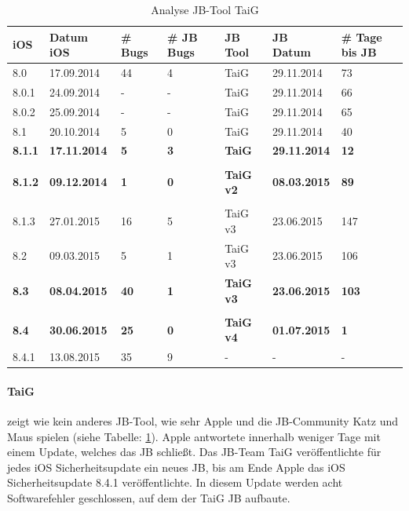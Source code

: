 \begin{table}[htp!]
    \begin{center}
        \begin{tabular}{| p{10mm} | p{22mm} | p{17mm} | p{12mm} | p{18mm} | p{22mm} | p{15mm} |} \hline
            \textbf{iOS} & \textbf{Datum iOS} & \textbf{\# Bugs} & \textbf{\# JB Bugs} & \textbf{JB Tool} & \textbf{JB Datum} & \textbf{\# Tage bis JB} \\ \hline 
8.0 & 17.09.2014 & 44 & 4 & TaiG & 29.11.2014 & 73  \\ \hline
8.0.1 & 24.09.2014	& - & - & TaiG & 29.11.2014 & 66 \\ \hline
8.0.2 & 25.09.2014 & - & -  & TaiG & 29.11.2014 & 65  \\ \hline
8.1 & 20.10.2014 & 5 & 0 & TaiG & 29.11.2014 & 40  \\ \hline
\textbf{8.1.1} & \textbf{17.11.2014} & \textbf{5} & \textbf{3} & \textbf{TaiG} & \textbf{29.11.2014} & \textbf{12}  \\ \hline
 & & & & & & \\ \hline						
\textbf{8.1.2} & \textbf{09.12.2014} & \textbf{1} & \textbf{0} & \textbf{TaiG v2} & \textbf{08.03.2015} & \textbf{89}  \\ \hline
	 & & & & & & \\ \hline						
8.1.3 & 27.01.2015 & 16 & 5 & TaiG v3 & 23.06.2015 & 147  \\ \hline
8.2  & 09.03.2015 & 5 & 1 & TaiG v3 & 23.06.2015 & 106 \\ \hline
\textbf{8.3} &  \textbf{08.04.2015} & \textbf{40} & \textbf{1} & \textbf{TaiG v3} & \textbf{23.06.2015} & \textbf{103}  \\ \hline
		 & & & & & & \\ \hline					
\textbf{8.4} &  \textbf{30.06.2015} & \textbf{25} & \textbf{0} & \textbf{TaiG v4} & \textbf{01.07.2015} & \textbf{1}  \\ \hline
8.4.1 & 13.08.2015 & 35 & 9 & - & - & -   \\ \hline
        \end{tabular} 
        \caption{Analyse JB-Tool TaiG \protect\footnotemark}
        \label{tab:AnalyseTaig}
    \end{center}
\end{table}


\paragraph{TaiG} zeigt wie kein anderes JB-Tool, wie sehr Apple und die JB-Community Katz und Maus spielen  (siehe Tabelle: \ref{tab:AnalyseTaig}). Apple antwortete innerhalb weniger Tage mit einem Update, welches das JB schließt. Das JB-Team TaiG veröffentlichte für jedes iOS Sicherheitsupdate ein neues JB, bis am Ende Apple das iOS Sicherheitsupdate 8.4.1 veröffentlichte. In diesem Update werden acht Softwarefehler geschlossen, auf dem der TaiG JB aufbaute. 
 
